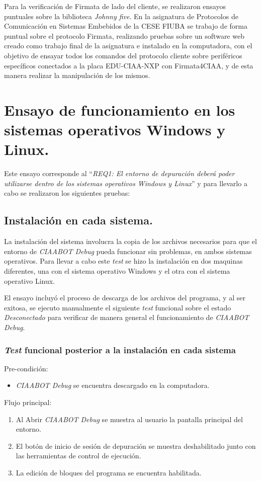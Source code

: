 Para la verificación de Firmata de lado del cliente, se realizaron ensayos puntuales sobre la biblioteca \emph{Johnny five}. En la asignatura de Protocolos de Comunicación en Sistemas Embebidos de la CESE FIUBA\citep{CESE} se trabajo de forma puntual sobre el protocolo Firmata, realizando pruebas sobre un software web creado como trabajo final de la asignatura e instalado en la computadora, con el objetivo de ensayar todos los comandos del protocolo cliente sobre periféricos específicos conectados a la placa EDU-CIAA-NXP con Firmata4CIAA, y de esta manera realizar la manipulación de los mismos.  


\section{Ensayo de funcionamiento en los sistemas operativos Windows y Linux.}
\label{sec:Ensayo de funcionamiento en los sistemas operativos Windows y Linux.}

Este ensayo corresponde al “\emph{REQ1: El entorno de depuración deberá poder utilizarse dentro de los sistemas operativos Windows y Linux}”  y para llevarlo a cabo se realizaron los siguientes pruebas:

\subsection{Instalación en cada sistema.}
\label{subsec:Instalación en cada sistema.}

La instalación del sistema involucra la copia de los archivos necesarios para que el entorno de \emph{CIAABOT Debug} pueda funcionar sin problemas, en ambos sistemas operativos. 
Para llevar a cabo este \emph{test} se hizo la instalación en dos maquinas diferentes, una con el sistema operativo Windows y el otra con el sistema operativo Linux. 

El ensayo incluyó el proceso de descarga de los archivos del programa, y al ser exitosa, se ejecuto manualmente el siguiente \emph{test} funcional  sobre el estado \emph{Desconectado} para verificar de manera general el funcionamiento de \emph{CIAABOT Debug}. 

\subsubsection{\emph{Test} funcional posterior a la instalación en cada sistema}
Pre-condición:
\begin{itemize}
	\item \emph{CIAABOT Debug} se encuentra descargado en la computadora.
\end{itemize}
Flujo principal:
\begin{enumerate}
	\item
     Al Abrir \emph{CIAABOT Debug} se muestra al usuario la pantalla principal del entorno.
	\item
	El botón de inicio de sesión de depuración se muestra deshabilitado junto con las herramientas de control de ejecución.
	\item
	La edición de bloques del programa se encuentra habilitada.
\end{enumerate}

